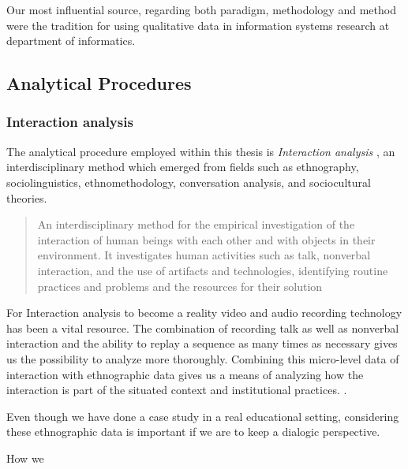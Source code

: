 Our most influential source, regarding both paradigm, methodology and method were the tradition for using qualitative data in information systems research at department of informatics. 



\subsection{Analytical Procedures}
\subsubsection{Interaction analysis}
The analytical procedure employed within this thesis is \emph{Interaction analysis} \citep{jordan1995interaction}, an interdisciplinary method which emerged from fields such as ethnography, sociolinguistics, ethnomethodology, conversation analysis, and sociocultural theories. 

\begin{quote}
An interdisciplinary method for the empirical investigation of the interaction of human
beings with each other and with objects in their environment. It investigates human
activities such as talk, nonverbal interaction, and the use of artifacts and technologies,
identifying routine practices and problems and the resources for their solution \citep[p39]{jordan1995interaction}
\end{quote}

For Interaction analysis to become a reality video and audio recording technology has been a vital resource. The combination of recording talk as well as nonverbal interaction and the ability to replay a sequence as many times as necessary gives us the possibility to analyze more thoroughly. Combining this micro-level data of interaction with ethnographic data gives us a means of analyzing how the interaction is part of the situated context and institutional practices. \citep{furberg2009scientific}. 

Even though we have done a case study in a real educational setting, considering these ethnographic data is important if we are to keep a dialogic perspective. 

How we 


